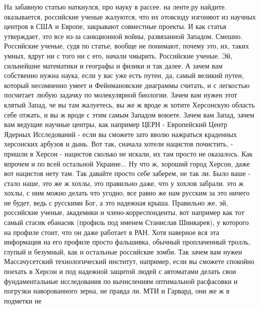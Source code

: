  
 
 
 
 

На забавную статью наткнулся, про науку в рассее. на ленте.ру найдите.
оказывается, российские ученые жалуются, что их отовсюду изгоняют из научных
центров в США и Европе, закрывают совместные проекты. И как статья утверждает,
это все из-за санкционной войны, развязанной Западом. Смешно. Российские
ученые, судя по статье, вообще не понимают, почему это, их, таких умных, вдруг
ни с того ни с его, начали чмырить. Российские ученые. Эй, сильнейшие
математики и географы и физики и так далее. А зачем вам собственно нужна наука,
если у вас уже есть путен, да, самый великий путен, который несомненно умеет и
Фейнмановские диаграммы считать, и с легкостью посчитает любую задачку по
молекулярной биологии. Зачем вам нужен этот клятый Запад, че вы там жалуетесь,
вы же ж вроде ж хотите Херсонскую область себе отжать, и вы ж вроде с этим
самым Западом воюете.  Зачем вам Запад, зачем вам ведущие научные центры, как
например ЦЕРН - Европейский Центр Ядерных Исследований - если вы сможете зато
вволю нажраться краденных херсонских арбузов и дынь. Вот так, сначала хотели
нацистов почистить, - пришли в Херсон - нацистов сколько не искали, их там
просто не оказалось. Как впрочем и по всей остальной Украине... Ну что ж,
хороший город Херсон, даже вот нацистов нету там. Так давайте просто себе
заберем, не так ли. Было ваше - стало наше, это же ж хохлы, это правильно даже,
что у хохлов забрали. это ж хохлы, с ним можно делать что угодно, все равно же
нам русским за это ничего не будет, ведь с русскими Бог, а это надежная крыша.
Правильно же, эй, российские ученые, академики и члено-корреспонденты, вот
например как тот самый стасик ебанасик (профиль под именем Станислав Шинкарев),
у которого на профиле стоит, что он даже работает в РАН. Хотя наверное вся эта
информация на его профиле просто фальшивка, обычный проплаченный тролль, глупый
и безумный, как и остальные российские зомби. Так зачем вам нужен
Массачусетский технологический институт, например, если вы сможете спокойно
поехать в Херсон и под надежной защитой людей с автоматами делать свои
фундаментальные исследования по вычислениям оптимальной расфасовки и погрузки
наворованного зерна, не правда ли. МТИ и Гарвард, они же ж в подметки не

